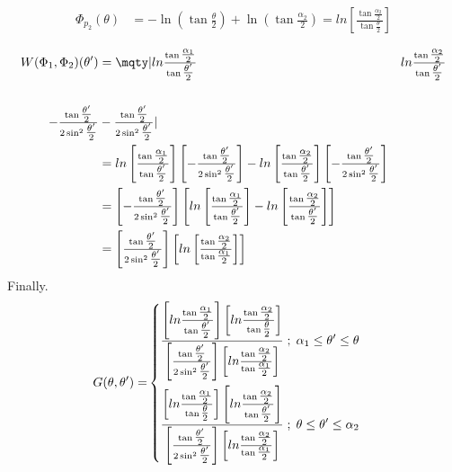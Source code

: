 \documentclass{article}
\begin{document}
{\begin{equation*}
\begin{split}
				\Phi_{p_2}(\theta) &= -\ln(\tan \tfrac{\theta}{2}) + \ln(\tan \tfrac{\alpha_2}{2}) = ln\left[ \tfrac{\tan \tfrac{\alpha_2}{2}}{\tan \tfrac{\theta}{2}} \right] \\
			\end{split}
		\end{equation*}
		\begin{equation*}
			\begin{split}
				W(\Phi_1, \Phi_2)(\theta') &= 
				\mqty| ln \tfrac{\tan \tfrac{\alpha_1}{2}}{\tan \tfrac{\theta'}{2}} & ln \tfrac{\tan \tfrac{\alpha_2}{2}}{\tan \tfrac{\theta'}{2}} \\\\ 
				-\tfrac{\tan \tfrac{\theta'}{2}}{2\sin^2 \tfrac{\theta'}{2}}   & -\tfrac{\tan \tfrac{\theta'}{2}}{2\sin^2 \tfrac{\theta'}{2}} | \\
				&= ln\left[ \tfrac{\tan \tfrac{\alpha_1}{2}}{\tan \tfrac{\theta'}{2}} \right] \left[ -\tfrac{\tan \tfrac{\theta'}{2}}{2\sin^2 \tfrac{\theta'}{2}} \right] - ln\left[ \tfrac{\tan \tfrac{\alpha_2}{2}}{\tan \tfrac{\theta'}{2}} \right] \left[ -\tfrac{\tan \tfrac{\theta'}{2}}{2\sin^2 \tfrac{\theta'}{2}} \right] \\
				&= \left[ -\tfrac{\tan \tfrac{\theta'}{2}}{2\sin^2 \tfrac{\theta'}{2}} \right] \left[ln\left[ \tfrac{\tan \tfrac{\alpha_1}{2}}{\tan \tfrac{\theta'}{2}} \right] - ln\left[ \tfrac{\tan \tfrac{\alpha_2}{2}}{\tan \tfrac{\theta'}{2}} \right]\right] \\
				&= \left[ \tfrac{\tan \tfrac{\theta'}{2}}{2\sin^2 \tfrac{\theta'}{2}} \right] \left[ln\left[ \tfrac{\tan \tfrac{\alpha_2}{2}}{\tan \tfrac{\alpha_1}{2}} \right]\right] \\
			\end{split}
		\end{equation*}
		Finally.
		\begin{equation*}
			\begin{split}
				G(\theta,\theta') =
				&\begin{dcases}
					\frac{\left[ln \tfrac{\tan \tfrac{\alpha_1}{2}}{\tan \tfrac{\theta'}{2}}\right] \left[ln \tfrac{\tan \tfrac{\alpha_2}{2}}{\tan \tfrac{\theta}{2}}\right] }{\left[ \tfrac{\tan \tfrac{\theta'}{2}}{2\sin^2 \tfrac{\theta'}{2}} \right] \left[ln \tfrac{\tan \tfrac{\alpha_2}{2}}{\tan \tfrac{\alpha_1}{2}}\right]} \; ; \; \alpha_1 \leq \theta' \leq \theta \\
					\frac{\left[ln \tfrac{\tan \tfrac{\alpha_1}{2}}{\tan \tfrac{\theta}{2}}\right] \left[ln \tfrac{\tan \tfrac{\alpha_2}{2}}{\tan \tfrac{\theta'}{2}}\right] }{\left[ \tfrac{\tan \tfrac{\theta'}{2}}{2\sin^2 \tfrac{\theta'}{2}} \right] \left[ln \tfrac{\tan \tfrac{\alpha_2}{2}}{\tan \tfrac{\alpha_1}{2}} \right]} \; ; \; \theta \leq \theta' \leq \alpha_2

\end{dcases}
\end{split}
\end{equation*}}
\end{document}
